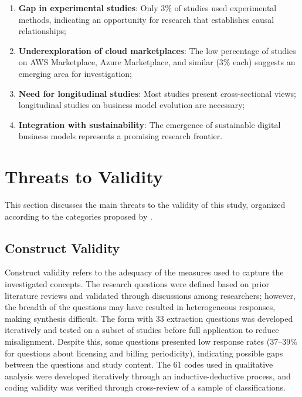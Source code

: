 \documentclass[journal]{IEEEtran}
\begin{document}
\begin{enumerate}
    \item \textbf{Gap in experimental studies}: Only 3\% of studies used experimental methods, indicating an opportunity for research that establishes causal relationships;

    \item \textbf{Underexploration of cloud marketplaces}: The low percentage of studies on AWS Marketplace, Azure Marketplace, and similar (3\% each) suggests an emerging area for investigation;

    \item \textbf{Need for longitudinal studies}: Most studies present cross-sectional views; longitudinal studies on business model evolution are necessary;

    \item \textbf{Integration with sustainability}: The emergence of sustainable digital business models represents a promising research frontier.
\end{enumerate}





\section{Threats to Validity}\label{sec:threats}

This section discusses the main threats to the validity of this study, organized according to the categories proposed by \cite{petersen2008systematic}.

\subsection{Construct Validity}

Construct validity refers to the adequacy of the measures used to capture the investigated concepts.
The research questions were defined based on prior literature reviews and validated through discussions among researchers; however, the breadth of the questions may have resulted in heterogeneous responses, making synthesis difficult.
The form with 33 extraction questions was developed iteratively and tested on a subset of studies before full application to reduce misalignment.
Despite this, some questions presented low response rates (37--39\% for questions about licensing and billing periodicity), indicating possible gaps between the questions and study content.
The 61 codes used in qualitative analysis were developed iteratively through an inductive-deductive process, and coding validity was verified through cross-review of a sample of classifications.
\end{document}
